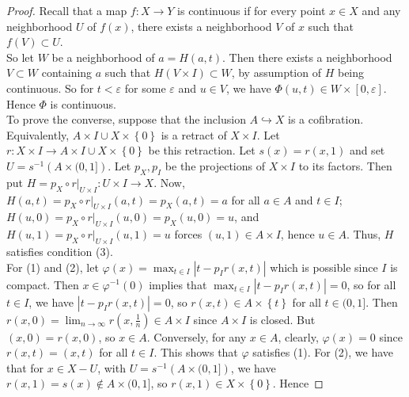 \begin{proof}
    Recall that a map $f \colon X \to Y$ is continuous
    if for every point $x \in X$ and any neighborhood
    $U$ of $f(x)$, there exists a neighborhood
    $V$ of $x$ such that $f(V) \subset U$.\\
    So let $W$ be a neighborhood of $a = 
    H(a,t)$. Then there exists a neighborhood
    $V \subset W$ containing $a$ such that
    $H\left( V \times I \right) \subset W$, by
    assumption of $H$ being continuous.
    So for $t < \varepsilon$ for some $\varepsilon$ and
    $u \in V$, we have
    $\Phi \left( u,t \right) 
    \in W \times \left[ 0,\varepsilon \right] $.
    Hence $\Phi$ is continuous.\\
    \linebreak
    To prove the converse, suppose that the
    inclusion $A \hookrightarrow X$ is a cofibration. Equivalently,
    $A \times I \cup  X \times \left\{ 0 \right\} $ is
    a retract of $X \times I$. Let $r
    \colon X \times I \to  A \times I \cup X \times
    \left\{ 0 \right\} $ be this retraction.
    Let $s(x) = r\left( x,1 \right) $ and set
    $U = s^{-1}\left( A \times (0,1] \right) $.
    Let $p_X, p_I$ be the projections of
    $X \times I$ to its factors. Then
    put $H = p_X \circ r|_{U \times I} \colon U \times I \to X$.
    Now, $H(a,t) = p_X \circ r |_{U \times I}(a,t)
    = p_X \left( a,t \right) = a$ for all
    $a \in A$ and $t \in I$;
    $H(u,0) = p_X \circ r|_{U \times I}(u,0) =
    p_X \left( u,0 \right) = u$, and
    $H\left( u,1 \right) =
    p_X \circ r|_{U \times I}(u,1) = 
    u$ forces $(u,1) \in A \times I$, hence
    $u \in A$. Thus, $H$ satisfies condition (3).\\
    For (1) and (2), let
    $\varphi (x) = 
    \max_{t \in I} \left| t - p_I r(x,t) \right| $ which
    is possible since $I$ is compact. Then
    $x \in \varphi^{-1}(0)$ implies that
    $\max_{t \in I} \left| t - p_I r(x,t) \right| = 0$, so
    for all $t \in I$, we have
    $\left| t - p_I r(x,t) \right| = 0$, so
    $r(x,t) \in A \times \left\{ t \right\} $ for all
    $t \in (0,1]$. Then
    $r\left( x,0 \right) = \lim_{n \to \infty}
    r\left( x, \frac{1}{n} \right) 
    \in A \times I$ since $A \times I$ is closed. But
    $(x,0) = r(x,0)$, so $x \in A$. Conversely, for any
    $x \in A$, clearly, $\varphi (x) = 0$ since
    $r(x,t) = (x,t)$ for all $t \in I$. This shows that
    $\varphi $ satisfies (1). 
    For (2), we have that for
    $x \in X -U$, with $U = 
    s^{-1}\left( A \times (0,1] \right) $, we
    have $r(x,1) = s(x) \not\in A \times (0,1]$, so
    $r(x,1) \in X \times \left\{ 0 \right\} $. Hence

\end{proof}
